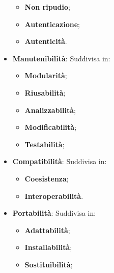 \begin{itemize}
\begin{itemize}
		\item \textbf{Non ripudio};
		\item \textbf{Autenticazione};
		\item \textbf{Autenticità}.
	\end{itemize}
	\item \textbf{Manutenibilità}: Suddivisa in:
	\begin{itemize}
		\item \textbf{Modularità};
		\item \textbf{Riusabilità};
		\item \textbf{Analizzabilità};
		\item \textbf{Modificabilità};
		\item \textbf{Testabilità};
	\end{itemize}
	\item \textbf{Compatibilità}: Suddivisa in:
	\begin{itemize}
		\item \textbf{Coesistenza};
		\item \textbf{Interoperabilità}.
	\end{itemize}
	\item \textbf{Portabilità}: Suddivisa in:
	\begin{itemize}
		\item \textbf{Adattabilità};
		\item \textbf{Installabilità};
		\item \textbf{Sostituibilità};
	\end{itemize}
\end{itemize}
